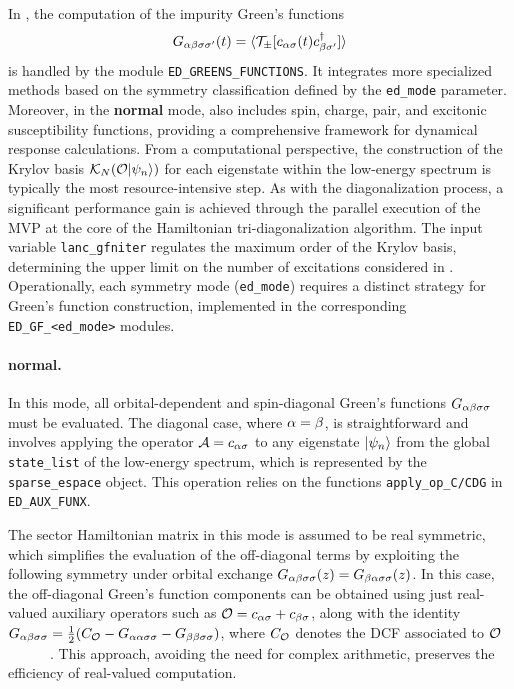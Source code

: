\documentclass[edipack_sp.tex]{subfiles}
\begin{document}
In \NAME, the computation of the impurity Green's functions 
$$
G_{\alpha\beta\sigma\sigma'}(t)=\langle {\cal T}_\pm[ c_{\alpha\sigma}(t) c_{\beta\sigma'}^\dagger ]\rangle
$$
is handled by the module \texttt{ED\_GREENS\_FUNCTIONS}.
It integrates more specialized methods based on the symmetry
classification defined by the \texttt{ed\_mode} parameter.
Moreover, in the {\bf normal} mode, \NAME also includes spin, charge, pair, and excitonic susceptibility functions, providing a comprehensive framework for dynamical response calculations.
From a computational perspective, the construction of the Krylov basis
$\mathcal{K}_N({\cal O}|\psi_n\rangle)$ for each eigenstate within the low-energy
spectrum is typically the most resource-intensive step.
As with the
diagonalization process, a significant performance gain is achieved through
the parallel execution of the MVP at the core of
the Hamiltonian tri-diagonalization algorithm.
The input variable
\texttt{lanc\_gfniter} regulates the maximum order of the Krylov basis,
determining the upper limit on the number of excitations considered in
.
Operationally, each symmetry mode (\texttt{ed\_mode}) requires a distinct
strategy for Green's function construction, implemented in the corresponding
\texttt{ED\_GF\_<ed\_mode>} modules.


\paragraph{{\bf normal}.}
In this mode, all orbital-dependent and spin-diagonal Green's 
functions $G_{\alpha\beta\sigma\sigma}$ must be evaluated. The diagonal 
case, where $\alpha=\beta$, is straightforward and involves applying 
the operator ${\cal A}=c_{\alpha\sigma}$ to any eigenstate $|\psi_n\rangle$ 
from the global {\tt state\_list} of the low-energy spectrum, 
which is represented by the {\tt sparse\_espace} object. This 
operation relies on the functions {\tt apply\_op\_C/CDG} in 
{\tt ED\_AUX\_FUNX}. 



The sector Hamiltonian matrix in this mode is assumed 
to be real symmetric, which simplifies the evaluation 
of the off-diagonal terms by exploiting the following symmetry 
under orbital exchange $G_{\alpha\beta\sigma\sigma}(z)=G_{\beta\alpha\sigma\sigma}(z)$. 
In this case, the off-diagonal Green's function components can be obtained using just real-valued auxiliary operators such as  
${\cal O}=c_{\alpha\sigma}+c_{\beta\sigma}$, along with the identity 
$G_{\alpha\beta\sigma\sigma}=\tfrac{1}{2}(C_{\cal O} - G_{\alpha\alpha\sigma\sigma} - G_{\beta\beta\sigma\sigma})$,
where $C_{\cal O}$ denotes the DCF associated to ${\cal O}$      . This approach, avoiding the need for complex arithmetic, preserves the efficiency of real-valued computation.  
\end{document}
